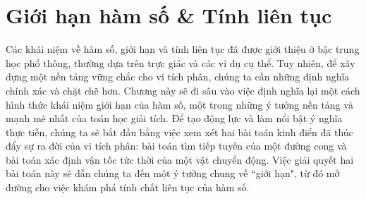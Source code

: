 \chapter{Giới hạn hàm số \& Tính liên tục}

Các khái niệm về hàm số, giới hạn và tính liên tục đã được giới thiệu ở bậc trung học phổ thông, thường dựa trên trực giác và các ví dụ cụ thể. Tuy nhiên, để xây dựng một nền tảng vững chắc cho vi tích phân, chúng ta cần những định nghĩa chính xác và chặt chẽ hơn. Chương này sẽ đi sâu vào việc định nghĩa lại một cách hình thức khái niệm giới hạn của hàm số, một trong những ý tưởng nền tảng và mạnh mẽ nhất của toán học giải tích. Để tạo động lực và làm nổi bật ý nghĩa thực tiễn, chúng ta sẽ bắt đầu bằng việc xem xét hai bài toán kinh điển đã thúc đẩy sự ra đời của vi tích phân: bài toán tìm tiếp tuyến của một đường cong và bài toán xác định vận tốc tức thời của một vật chuyển động. Việc giải quyết hai bài toán này sẽ dẫn chúng ta đến một ý tưởng chung về ``giới hạn", từ đó mở đường cho việc khám phá tính chất liên tục của hàm số.


